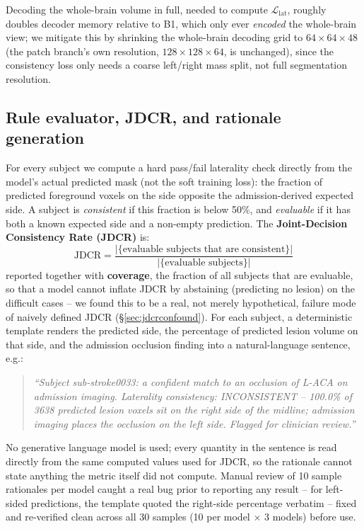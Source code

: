 \documentclass[conference]{IEEEtran}
\begin{document}
Decoding the whole-brain volume in full, needed to compute $\mathcal{L}_{\text{lat}}$, roughly doubles decoder memory relative to B1, which only ever \emph{encoded} the whole-brain view; we mitigate this by shrinking the whole-brain decoding grid to $64{\times}64{\times}48$ (the patch branch's own resolution, $128{\times}128{\times}64$, is unchanged), since the consistency loss only needs a coarse left/right mass split, not full segmentation resolution.

\subsection{Rule evaluator, JDCR, and rationale generation}

For every subject we compute a hard pass/fail laterality check directly from the model's actual predicted mask (not the soft training loss): the fraction of predicted foreground voxels on the side opposite the admission-derived expected side. A subject is \emph{consistent} if this fraction is below 50\%, and \emph{evaluable} if it has both a known expected side and a non-empty prediction. The \textbf{Joint-Decision Consistency Rate (JDCR)} is:
\begin{equation}
\mathrm{JDCR} = \frac{|\{\text{evaluable subjects that are consistent}\}|}{|\{\text{evaluable subjects}\}|}
\end{equation}
reported together with \textbf{coverage}, the fraction of all subjects that are evaluable, so that a model cannot inflate JDCR by abstaining (predicting no lesion) on the difficult cases -- we found this to be a real, not merely hypothetical, failure mode of naively defined JDCR (\S\ref{sec:jdcrconfound}). For each subject, a deterministic template renders the predicted side, the percentage of predicted lesion volume on that side, and the admission occlusion finding into a natural-language sentence, e.g.:

\begin{quote}\footnotesize
\textit{``Subject sub-stroke0033: a confident match to an occlusion of L-ACA on admission imaging. Laterality consistency: INCONSISTENT -- 100.0\% of 3638 predicted lesion voxels sit on the right side of the midline; admission imaging places the occlusion on the left side. Flagged for clinician review.''}
\end{quote}

No generative language model is used; every quantity in the sentence is read directly from the same computed values used for JDCR, so the rationale cannot state anything the metric itself did not compute. Manual review of 10 sample rationales per model caught a real bug prior to reporting any result -- for left-sided predictions, the template quoted the right-side percentage verbatim -- fixed and re-verified clean across all 30 samples (10 per model $\times$ 3 models) before use.
\end{document}
